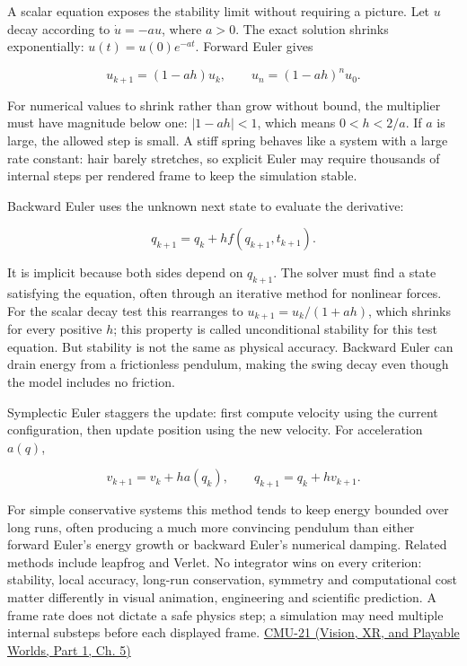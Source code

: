 A scalar equation exposes the stability limit without requiring a picture. Let \(u\) decay according to \(\dot u=-a u\), where \(a>0\). The exact solution shrinks exponentially: \(u(t)=u(0)e^{-at}\). Forward Euler gives

\[
u_{k+1}=(1-ah)u_k,
\qquad
u_n=(1-ah)^n u_0.
\]

For numerical values to shrink rather than grow without bound, the multiplier must have magnitude below one: \(|1-ah|<1\), which means \(0<h<2/a\). If \(a\) is large, the allowed step is small. A stiff spring behaves like a system with a large rate constant: hair barely stretches, so explicit Euler may require thousands of internal steps per rendered frame to keep the simulation stable.

Backward Euler uses the unknown next state to evaluate the derivative:

\[
q_{k+1}=q_k+h f(q_{k+1},t_{k+1}).
\]

It is implicit because both sides depend on \(q_{k+1}\). The solver must find a state satisfying the equation, often through an iterative method for nonlinear forces. For the scalar decay test this rearranges to \(u_{k+1}=u_k/(1+ah)\), which shrinks for every positive \(h\); this property is called unconditional stability for this test equation. But stability is not the same as physical accuracy. Backward Euler can drain energy from a frictionless pendulum, making the swing decay even though the model includes no friction.

Symplectic Euler staggers the update: first compute velocity using the current configuration, then update position using the new velocity. For acceleration \(a(q)\),

\[
v_{k+1}=v_k+h a(q_k),\qquad q_{k+1}=q_k+h v_{k+1}.
\]

For simple conservative systems this method tends to keep energy bounded over long runs, often producing a much more convincing pendulum than either forward Euler's energy growth or backward Euler's numerical damping. Related methods include leapfrog and Verlet. No integrator wins on every criterion: stability, local accuracy, long-run conservation, symmetry and computational cost matter differently in visual animation, engineering and scientific prediction. A frame rate does not dictate a safe physics step; a simulation may need multiple internal substeps before each displayed frame. \href{../07-Vision-XR-and-Playable-Worlds-P01/main.pdf\#nameddest=04-visual-computing-ii-ch036-cmu-21---dynamics-and-time-integration}{CMU-21 (Vision, XR, and Playable Worlds, Part 1, Ch. 5)}

